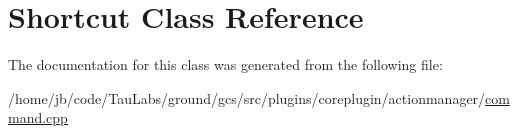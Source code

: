 \hypertarget{class_shortcut}{\section{\-Shortcut \-Class \-Reference}
\label{class_shortcut}
}


\-The documentation for this class was generated from the following file\-:\begin{DoxyCompactItemize}
\item 
/home/jb/code/\-Tau\-Labs/ground/gcs/src/plugins/coreplugin/actionmanager/\hyperlink{command_8cpp}{command.\-cpp}\end{DoxyCompactItemize}
